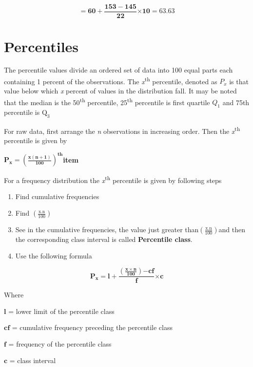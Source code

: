 \documentclass[
]{book}
\begin{document}
\[\mathbf{= 60 +}\frac{\mathbf{153 - 145}}{\mathbf{22}}\mathbf{\times 10 = 63.63}\]

\hypertarget{percentiles}{%
\section{Percentiles}\label{percentiles}}

The percentile values divide an ordered set of data into 100 equal parts
each containing 1 percent of the observations. The \emph{x}\textsuperscript{th} percentile,
denoted as \(P_{x}\) is that value below which \emph{x} percent of values in
the distribution fall. It may be noted that the median is the 50\textsuperscript{th}
percentile, 25\textsuperscript{th} percentile is first quartile \(Q_{1}\) and 75th
percentile is\(\text{\ Q}_{3}\ \)

For raw data, first arrange the \emph{n} observations in increasing order.
Then the \emph{x}\textsuperscript{th} percentile is given by

\(\mathbf{P}_{\mathbf{x}}\mathbf{=}\left( \frac{\mathbf{x}\left( \mathbf{n + 1} \right)}{\mathbf{100}} \right)^{\mathbf{\text{th}}}\)\textbf{item}

For a frequency distribution the \emph{x}\textsuperscript{th} percentile is given by
following steps

\begin{enumerate}
\def\labelenumi{\arabic{enumi}.}
\item
  Find cumulative frequencies
\item
  Find \(\left( \frac{\text{x.n}}{100} \right)\)
\item
  See in the cumulative frequencies, the value just greater
  than\(\left( \frac{\text{x.n}}{100} \right)\)and then the
  corresponding class interval is called \textbf{Percentile class}.
\item
  Use the following formula
\end{enumerate}

\[\mathbf{P}_{\mathbf{x}}\mathbf{= l +}\frac{\left( \frac{\mathbf{x \times n}}{\mathbf{100}} \right)\mathbf{- cf}}{\mathbf{f}}\mathbf{\times c}\]

Where

\(\mathbf{l}\) = lower limit of the percentile class

\(\mathbf{\text{cf}}\) = cumulative frequency preceding the percentile
class

\(\mathbf{f}\) = frequency of the percentile class

\(\mathbf{c}\) = class interval
\end{document}
